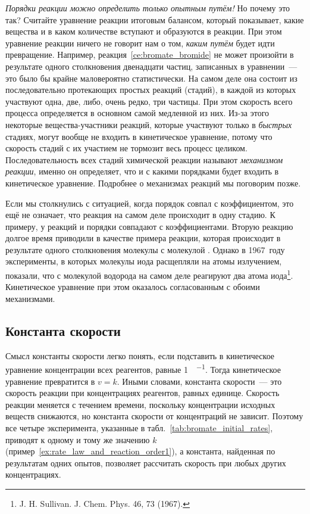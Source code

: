\emph{Порядки реакции можно определить только опытным путём!} Но почему это так? Считайте уравнение реакции итоговым балансом, который показывает, какие вещества и в каком количестве вступают и образуются в реакции. При этом уравнение реакции ничего не говорит нам о том, \emph{каким путём} будет идти превращение. Например, реакция~\eqref{ce:bromate_bromide} не может произойти в результате одного столкновения двенадцати частиц, записанных в уравнении~--- это было бы крайне маловероятно статистически. На самом деле она состоит из последовательно протекающих простых реакций (стадий), в каждой из которых участвуют одна, две, либо, очень редко, три частицы. При этом скорость всего процесса определяется в основном самой медленной из них. Из-за этого некоторые вещества-участники реакций, которые участвуют только в \emph{быстрых} стадиях, могут вообще не входить в кинетическое уравнение, потому что скорость стадий с их участием не тормозит весь процесс целиком. Последовательность всех стадий химической реакции называют \emph{механизмом реакции}, именно он определяет, что и с какими порядками будет входить в кинетическое уравнение. Подробнее о механизмах реакций мы поговорим позже.

Если мы столкнулись с ситуацией, когда порядок совпал с коэффициентом, это ещё не означает, что реакция на самом деле происходит в одну стадию. К примеру, у реакций  и  порядки совпадают с коэффициентами. Вторую реакцию долгое время приводили в качестве примера реакции, которая происходит в результате одного столкновения молекулы  с молекулой . Однако в 1967~году эксперименты, в которых молекулы иода расщепляли на атомы излучением, показали, что с молекулой водорода на самом деле реагируют два атома иода\footnote{J. H. Sullivan. J. Chem. Phys. 46, 73 (1967).}. Кинетическое уравнение при этом оказалось согласованным с обоими механизмами.

\subsection*{Константа скорости}

Смысл константы скорости легко понять, если подставить в кинетическое уравнение концентрации всех реагентов, равные \qty{1}{\ruMole\per\ruL}. Тогда кинетическое уравнение превратится в $v = k$. Иными словами, константа скорости~--- это скорость реакции при концентрациях реагентов, равных единице. Скорость реакции меняется с течением времени, поскольку концентрации исходных веществ снижаются, но константа скорости от концентраций не зависит. Поэтому все четыре эксперимента, указанные в табл.~\ref{tab:bromate_initial_rates}, приводят к одному и тому же значению $k$ (пример~\ref{ex:rate_law_and_reaction_order1}), а константа, найденная по результатам одних опытов, позволяет рассчитать скорость при любых других концентрациях.

